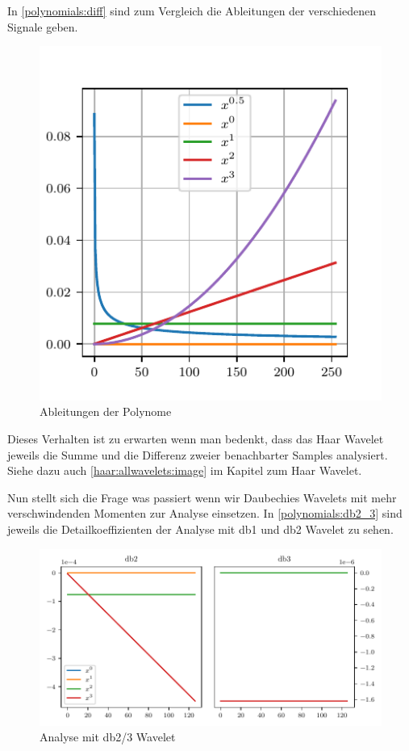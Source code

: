 \begin{refsection}
In \autoref{polynomials:diff} sind zum Vergleich die Ableitungen der
verschiedenen Signale geben.

\begin{figure}
    \centering
    \includegraphics{papers/polynomials/images/polynomials_signals_diff.pdf}
    \caption{Ableitungen der Polynome\label{polynomials:diff}}
\end{figure}

Dieses Verhalten ist zu erwarten wenn man bedenkt, dass das Haar Wavelet
jeweils die Summe und die Differenz zweier benachbarter Samples analysiert.
Siehe dazu auch \autoref{haar:allwavelets:image} im Kapitel zum Haar Wavelet.

Nun stellt sich die Frage was passiert wenn wir Daubechies Wavelets mit mehr
verschwindenden Momenten zur Analyse einsetzen. In \autoref{polynomials:db2_3}
sind jeweils die Detailkoeffizienten der Analyse mit db1 und db2 Wavelet zu
sehen.

\begin{figure}
    \centering
    \includegraphics{papers/polynomials/images/polynomials_signals_db2_3.pdf}
    \caption{Analyse mit db2/3 Wavelet\label{polynomials:db2_3}}
\end{figure}


\end{refsection}
